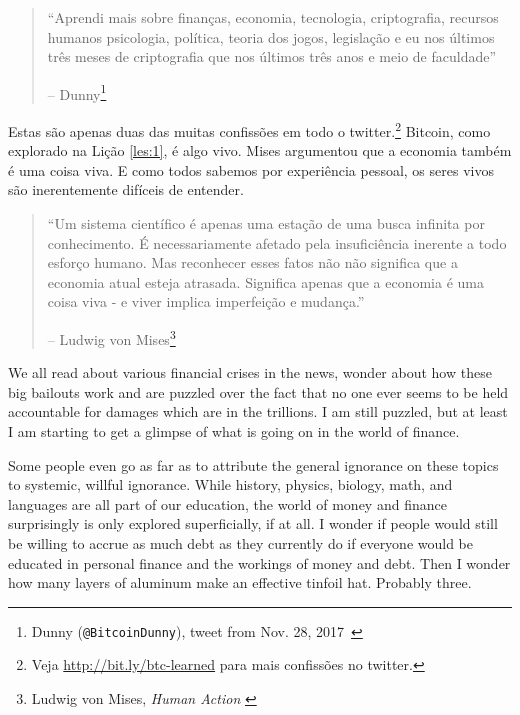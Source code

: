 \begin{quotation}\begin{samepage}
\enquote{Aprendi mais sobre finanças, economia, tecnologia, criptografia, recursos humanos
psicologia, política, teoria dos jogos, legislação e eu nos últimos três
meses de criptografia que nos últimos três anos e meio de faculdade}
\begin{flushright} -- Dunny\footnote{Dunny (\texttt{@BitcoinDunny}), tweet from Nov. 28,
2017~\cite{bitcoindunny-tweet}}
\end{flushright}\end{samepage}\end{quotation}

Estas são apenas duas das muitas confissões em todo o twitter.\footnote{Veja
\url{http://bit.ly/btc-learned} para mais confissões no twitter.} Bitcoin, como
explorado na Lição \ref{les:1}, é algo vivo. Mises argumentou que
a economia também é uma coisa viva. E como todos sabemos por experiência pessoal,
os seres vivos são inerentemente difíceis de entender.

\begin{quotation}\begin{samepage}
\enquote{Um sistema científico é apenas uma estação de uma busca infinita por conhecimento. 
É necessariamente afetado pela insuficiência inerente a todo esforço humano. Mas reconhecer esses fatos não
não significa que a economia atual esteja atrasada.
Significa apenas que a economia é uma coisa viva - e viver implica imperfeição e mudança.}
\begin{flushright} -- Ludwig von Mises\footnote{Ludwig von Mises, \textit{Human Action}
\cite{human-action}}
\end{flushright}\end{samepage}\end{quotation}

\newpage

We all read about various financial crises in the news, wonder about how
these big bailouts work and are puzzled over the fact that no one ever
seems to be held accountable for damages which are in the trillions. I
am still puzzled, but at least I am starting to get a glimpse of what is
going on in the world of finance.

Some people even go as far as to attribute the general ignorance on
these topics to systemic, willful ignorance. While history, physics,
biology, math, and languages are all part of our education, the world of
money and finance surprisingly is only explored superficially, if at
all. I wonder if people would still be willing to accrue as much debt as
they currently do if everyone would be educated in personal finance and
the workings of money and debt. Then I wonder how many layers of
aluminum make an effective tinfoil hat. Probably three.

